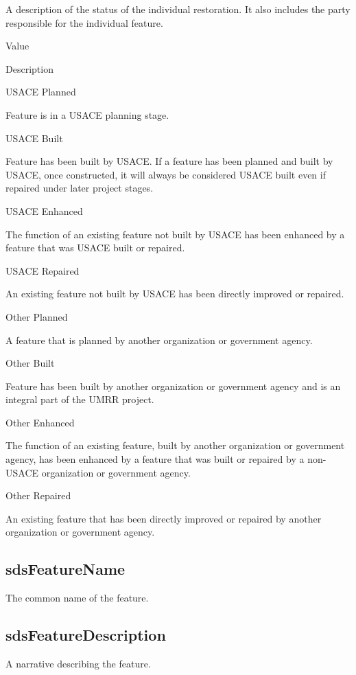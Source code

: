 \documentclass[
  letterpaper,
  DIV=11,
  numbers=noendperiod]{scrreprt}
\begin{document}
A description of the status of the individual restoration. It also
includes the party responsible for the individual feature.

Value

Description

USACE Planned

Feature is in a USACE planning stage.

USACE Built

Feature has been built by USACE. If a feature has been planned and built
by USACE, once constructed, it will always be considered USACE built
even if repaired under later project stages.

USACE Enhanced

The function of an existing feature not built by USACE has been enhanced
by a feature that was USACE built or repaired.

USACE Repaired

An existing feature not built by USACE has been directly improved or
repaired.

Other Planned

A feature that is planned by another organization or government agency.

Other Built

Feature has been built by another organization or government agency and
is an integral part of the UMRR project.

Other Enhanced

The function of an existing feature, built by another organization or
government agency, has been enhanced by a feature that was built or
repaired by a non-USACE organization or government agency.

Other Repaired

An existing feature that has been directly improved or repaired by
another organization or government agency.

\subsection{sdsFeatureName}\label{sdsfeaturename-8}

The common name of the feature.

\subsection{sdsFeatureDescription}\label{sdsfeaturedescription-8}

A narrative describing the feature.
\end{document}

